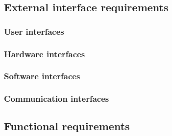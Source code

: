 \documentclass[12pt]{article}
\begin{document}
  \subsection{External interface requirements}
    \subsubsection{User interfaces}
    \subsubsection{Hardware interfaces}
    \subsubsection{Software interfaces}
    \subsubsection{Communication interfaces}
  \subsection{Functional requirements}
\end{document}
